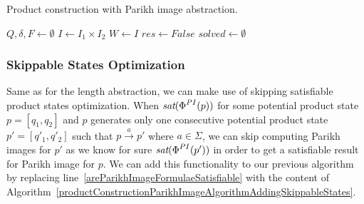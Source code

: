 \begin{algorithm}
\caption{Product construction with Parikh image abstraction.}\label{productConstructionParikhImageAlgorithm}
\DontPrintSemicolon
{}
\BlankLine
$Q, \delta, F \gets \emptyset$ \;
$I \gets I_1 \times I_2$ \;
$W \gets I$ \;
$res \gets False$ \;
$solved \gets \emptyset$ \;\label{PIAlgorithm:solved}
\end{algorithm}

\subsubsection{Skippable States Optimization}

Same as for the length abstraction, we can make use of skipping satisfiable product states optimization. When $\emph{sat}(\emph{$\Phi$}^{PI}(p))$ for some potential product state $p = [q_1, q_2]$ and $p$ generates only one consecutive potential product state $p' = [q'_1, q'_2]$ such that $p \xrightarrow{a} p'$ where $ a \in \Sigma $, we can skip computing Parikh images for $p'$ as we know for sure $\emph{sat}(\emph{$\Phi$}^{PI}(p'))$ in order to get a satisfiable result for Parikh image for $p$. We can add this functionality to our previous algorithm by replacing line~\ref{areParikhImageFormulaeSatisfiable} with the content of Algorithm~\ref{productConstructionParikhImageAlgorithmAddingSkippableStates}.

